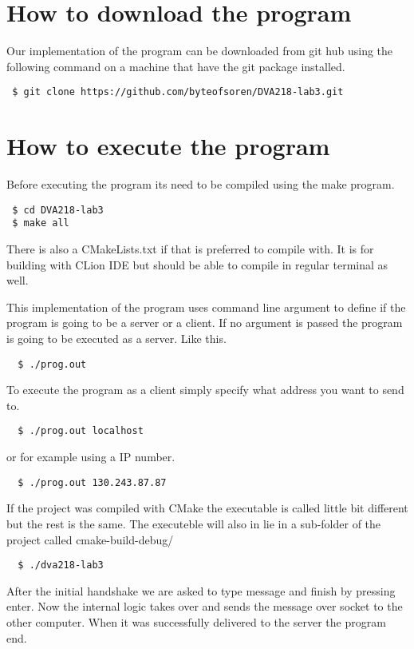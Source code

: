 \section{How to download the program}
Our implementation of the program can be downloaded from git hub using the following command on a machine that have the git package installed.
\begin{lstlisting}
 $ git clone https://github.com/byteofsoren/DVA218-lab3.git
\end{lstlisting}

\section{How to execute the program}
Before executing the program its need to be compiled using the make program.
\begin{lstlisting}
 $ cd DVA218-lab3
 $ make all
\end{lstlisting}

There is also a CMakeLists.txt if that is preferred to compile with. It is for building with CLion IDE but should be able to compile in regular terminal as well.


This implementation of the program uses command line argument to define if the program is going to be a server or a client. If no argument is passed the program is going to be executed as a server. Like this.

\begin{lstlisting}
  $ ./prog.out
\end{lstlisting}

To execute the program as a client simply specify what address you want to send to.
\begin{lstlisting}
  $ ./prog.out localhost
\end{lstlisting}

or for example using a IP number. 
\begin{lstlisting}
  $ ./prog.out 130.243.87.87
\end{lstlisting}
 
If the project was compiled with CMake the executable is called little bit different but the rest is the same. The executeble will also in lie in a sub-folder of the project called cmake-build-debug/
\begin{lstlisting}
  $ ./dva218-lab3
\end{lstlisting}


After the initial handshake we are asked to type message and finish by pressing enter. Now the internal logic takes over and sends the message over socket to the other computer. When it was successfully delivered to the server the program end.


